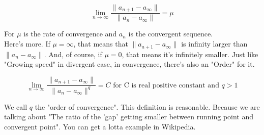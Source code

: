\documentclass{article}
\begin{document}
  \[
	  \displaystyle \lim_{n \to \infty} \dfrac{\|a_{n+1} - a_\infty\|}{\|a_{n} - a_{\infty}\|} = \mu
  \]

  For $\mu$ is the rate of convergence and $a_{n}$ is the convergent sequence. \\ 
  
  Here's more. If $\mu=\infty$, that means that $\|a_{a+1}-a_{\infty}\|$ is infinity larger than $\|a_{n}-a_{\infty}\|$. And, of course, if $\mu=0$, that means it's infinitely smaller. Just like "Growing speed" in divergent case, in convergence, there's also an "Order" for it.

  \[
	  \displaystyle \lim_{n \to \infty} \dfrac{\|a_{n+1} - a_\infty\|}{\|a_{n} - a_{\infty}\|^{q}} = C \text{ for C is real positive constant and } q>1
  \]

  We call $q$ the "order of convergence". This definition is reasonable. Because we are talking about "The ratio of the 'gap' getting smaller between running point and convergent point". You can get a lotta example in Wikipedia.
\end{document}
